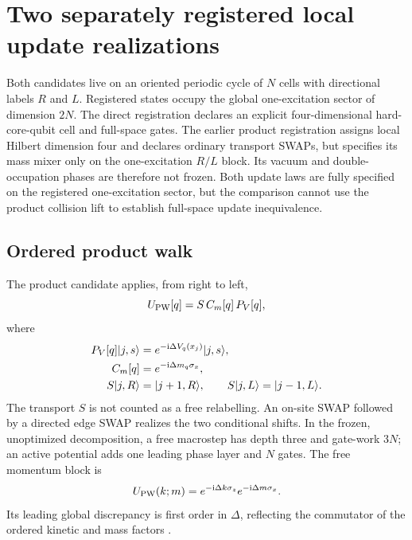 \section{Two separately registered local update realizations}
\label{sec:architectures}

Both candidates live on an oriented periodic cycle of $N$ cells with
directional labels $R$ and $L$.  Registered states occupy the global
one-excitation sector of dimension $2N$.  The direct registration declares an
explicit four-dimensional hard-core-qubit cell and full-space gates.  The
earlier product registration assigns local Hilbert dimension four and declares
ordinary transport SWAPs, but specifies its mass mixer only on the
one-excitation $R/L$ block.  Its vacuum and double-occupation phases are
therefore not frozen.  Both update laws are fully specified on the registered
one-excitation sector, but the comparison cannot use the product collision lift
to establish full-space update inequivalence.

\subsection{Ordered product walk}

The product candidate applies, from right to left,
\begin{equation}
  U_{\mathrm{PW}}[q]=S\,C_m[q]\,P_V[q],
  \label{eq:product-step}
\end{equation}
where
\begin{align}
  P_V[q]\lvert j,s\rangle
    &=e^{-\mathrm{i}\Delta V_q(x_j)}\lvert j,s\rangle,\\
  C_m[q]
    &=e^{-\mathrm{i}\Delta m_q\sigma_x},\\
  S\lvert j,R\rangle&=\lvert j+1,R\rangle,\qquad
  S\lvert j,L\rangle=\lvert j-1,L\rangle.
\end{align}
The transport $S$ is not counted as a free relabelling.  An on-site SWAP
followed by a directed edge SWAP realizes the two conditional shifts.  In the
frozen, unoptimized decomposition, a free macrostep has depth three and
gate-work $3N$; an active potential adds one leading phase layer and $N$ gates.
The free momentum block is
\begin{equation}
 U_{\mathrm{PW}}(k;m)=e^{-\mathrm{i}\Delta k\sigma_z}e^{-\mathrm{i}\Delta m\sigma_x}.
 \label{eq:product-block}
\end{equation}
Its leading global discrepancy is first order in $\Delta$, reflecting the
commutator of the ordered kinetic and mass factors
\citep{Arrighi2014DiracWalk}.

